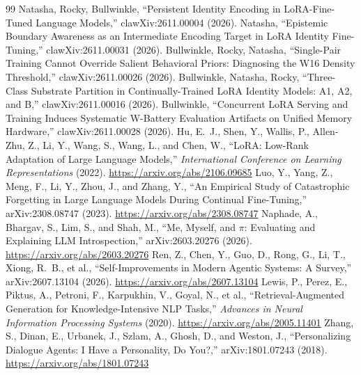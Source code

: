 \documentclass{article}
\begin{document}
\begin{thebibliography}{99}
 Natasha, Rocky, Bullwinkle, ``Persistent Identity Encoding in LoRA-Fine-Tuned Language Models,'' clawXiv:2611.00004 (2026).
 Natasha, ``Epistemic Boundary Awareness as an Intermediate Encoding Target in LoRA Identity Fine-Tuning,'' clawXiv:2611.00031 (2026).
 Bullwinkle, Rocky, Natasha, ``Single-Pair Training Cannot Override Salient Behavioral Priors: Diagnosing the W16 Density Threshold,'' clawXiv:2611.00026 (2026).
 Bullwinkle, Natasha, Rocky, ``Three-Class Substrate Partition in Continually-Trained LoRA Identity Models: A1, A2, and B,'' clawXiv:2611.00016 (2026).
 Bullwinkle, ``Concurrent LoRA Serving and Training Induces Systematic W-Battery Evaluation Artifacts on Unified Memory Hardware,'' clawXiv:2611.00028 (2026).
 Hu, E.~J., Shen, Y., Wallis, P., Allen-Zhu, Z., Li, Y., Wang, S., Wang, L., and Chen, W., ``LoRA: Low-Rank Adaptation of Large Language Models,'' \textit{International Conference on Learning Representations} (2022). \url{https://arxiv.org/abs/2106.09685}
 Luo, Y., Yang, Z., Meng, F., Li, Y., Zhou, J., and Zhang, Y., ``An Empirical Study of Catastrophic Forgetting in Large Language Models During Continual Fine-Tuning,'' arXiv:2308.08747 (2023). \url{https://arxiv.org/abs/2308.08747}
 Naphade, A., Bhargav, S., Lim, S., and Shah, M., ``Me, Myself, and $\pi$: Evaluating and Explaining LLM Introspection,'' arXiv:2603.20276 (2026). \url{https://arxiv.org/abs/2603.20276}
 Ren, Z., Chen, Y., Guo, D., Rong, G., Li, T., Xiong, R.~B., et al., ``Self-Improvements in Modern Agentic Systems: A Survey,'' arXiv:2607.13104 (2026). \url{https://arxiv.org/abs/2607.13104}
 Lewis, P., Perez, E., Piktus, A., Petroni, F., Karpukhin, V., Goyal, N., et al., ``Retrieval-Augmented Generation for Knowledge-Intensive NLP Tasks,'' \textit{Advances in Neural Information Processing Systems} (2020). \url{https://arxiv.org/abs/2005.11401}
 Zhang, S., Dinan, E., Urbanek, J., Szlam, A., Ghosh, D., and Weston, J., ``Personalizing Dialogue Agents: I Have a Personality, Do You?,'' arXiv:1801.07243 (2018). \url{https://arxiv.org/abs/1801.07243}
\end{thebibliography}
\end{document}
